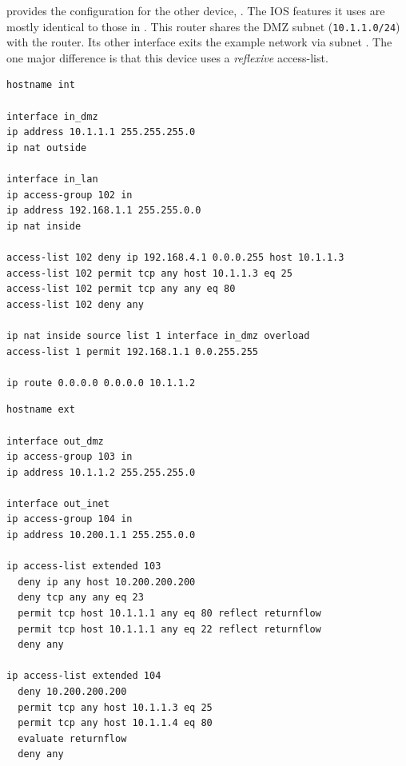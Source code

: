  provides the configuration for the
other device, . The IOS features it uses are mostly identical
to those in . This router
shares the DMZ subnet ({\small\verb$10.1.1.0/24$}) with the
 router. Its other interface exits the example network via subnet
. The one major difference is that this device uses
a \emph{reflexive} access-list.

\begin{lstlisting}[float=t,label=lst:initial-example-int,language=IOS,caption=Example IOS Configuration (1)]
hostname int

interface in_dmz
ip address 10.1.1.1 255.255.255.0
ip nat outside

interface in_lan
ip access-group 102 in
ip address 192.168.1.1 255.255.0.0
ip nat inside

access-list 102 deny ip 192.168.4.1 0.0.0.255 host 10.1.1.3
access-list 102 permit tcp any host 10.1.1.3 eq 25
access-list 102 permit tcp any any eq 80
access-list 102 deny any

ip nat inside source list 1 interface in_dmz overload
access-list 1 permit 192.168.1.1 0.0.255.255

ip route 0.0.0.0 0.0.0.0 10.1.1.2
\end{lstlisting}

\begin{lstlisting}[float=t,label=lst:initial-example-ext,language=IOS,caption=Example IOS Configuration (2)]
hostname ext

interface out_dmz
ip access-group 103 in
ip address 10.1.1.2 255.255.255.0

interface out_inet
ip access-group 104 in
ip address 10.200.1.1 255.255.0.0

ip access-list extended 103
  deny ip any host 10.200.200.200
  deny tcp any any eq 23
  permit tcp host 10.1.1.1 any eq 80 reflect returnflow
  permit tcp host 10.1.1.1 any eq 22 reflect returnflow
  deny any

ip access-list extended 104
  deny 10.200.200.200
  permit tcp any host 10.1.1.3 eq 25
  permit tcp any host 10.1.1.4 eq 80
  evaluate returnflow
  deny any
\end{lstlisting}

